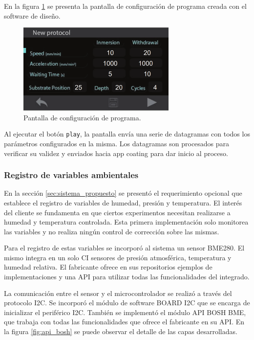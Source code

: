  
En la figura \ref{fig:stone_a} se presenta la pantalla de configuración de programa creada con el software de diseño. 

\begin{figure}[h!]
	\centering
	\includegraphics[width=0.7\textwidth]{./Figures/pantalla.png}
	\caption{Pantalla de configuración de programa.}
	\label{fig:stone_a}
\end{figure}  

Al ejecutar el botón \texttt{play}, la pantalla envía una serie de datagramas con todos los parámetros configurados en la misma. Los datagramas son procesados para verificar su validez y enviados hacia app coating para dar inicio al proceso. 
 

\subsubsection{Registro de variables ambientales}

En la sección \ref{sec:sistema_propuesto} se presentó el requerimiento opcional que establece el registro de variables de humedad, presión y temperatura. El interés del cliente se fundamenta en que ciertos experimentos necesitan realizarse a humedad y temperatura controlada. Esta primera implementación solo monitorea las variables y no realiza ningún control de corrección sobre las mismas. 

Para el registro de estas variables se incorporó al sistema un sensor BME280. El mismo integra en un solo CI sensores de presión atmosférica, temperatura y humedad relativa. El fabricante ofrece en sus repositorios \citep{web_repositorio_api_bosh} ejemplos de implementaciones y una API para utilizar todas las funcionalidades del integrado.

La comunicación entre el sensor y el microcontrolador se realizó a través del protocolo I2C. Se incorporó el módulo de software BOARD I2C que se encarga de inicializar el periférico I2C. También se implementó el módulo API BOSH BME, que trabaja con todas las funcionalidades que ofrece el fabricante en su API. En la figura \ref{fig:api_bosh} se puede observar el detalle de las capas desarrolladas.

